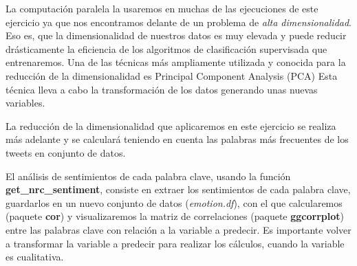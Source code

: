 \documentclass[]{article}
\newenvironment{Shaded}{\begin{snugshade}}{\end{snugshade}}
\newcommand{\CharTok}[1]{\textcolor[rgb]{0.31,0.60,0.02}{#1}}
\newcommand{\DataTypeTok}[1]{\textcolor[rgb]{0.13,0.29,0.53}{#1}}
\newcommand{\DecValTok}[1]{\textcolor[rgb]{0.00,0.00,0.81}{#1}}
\newcommand{\KeywordTok}[1]{\textcolor[rgb]{0.13,0.29,0.53}{\textbf{#1}}}
\newcommand{\NormalTok}[1]{#1}
\newcommand{\OperatorTok}[1]{\textcolor[rgb]{0.81,0.36,0.00}{\textbf{#1}}}
\newcommand{\OtherTok}[1]{\textcolor[rgb]{0.56,0.35,0.01}{#1}}
\newcommand{\StringTok}[1]{\textcolor[rgb]{0.31,0.60,0.02}{#1}}
\begin{document}
La computación paralela la usaremos en muchas de las ejecuciones de este
ejercicio ya que nos encontramos delante de un problema de \emph{alta
dimensionalidad}. Eso es, que la dimensionalidad de nuestros datos es
muy elevada y puede reducir drásticamente la eficiencia de los
algoritmos de clasificación supervisada que entrenaremos. Una de las
técnicas más ampliamente utilizada y conocida para la reducción de la
dimensionalidad es Principal Component Analysis (PCA) Esta técnica lleva
a cabo la transformación de los datos generando unas nuevas variables.

La reducción de la dimensionalidad que aplicaremos en este ejercicio se
realiza más adelante y se calculará teniendo en cuenta las palabras más
frecuentes de los tweets en conjunto de datos.

El análisis de sentimientos de cada palabra clave, usando la función
\textbf{get\_nrc\_sentiment}, consiste en extraer los sentimientos de
cada palabra clave, guardarlos en un nuevo conjunto de datos
(\emph{emotion.df}), con el que calcularemos (paquete \textbf{cor}) y
visualizaremos la matriz de correlaciones (paquete \textbf{ggcorrplot})
entre las palabras clave con relación a la variable a predecir. Es
importante volver a transformar la variable a predecir para realizar los
cálculos, cuando la variable es cualitativa.

\begin{Shaded}
\end{Shaded}
\end{document}
